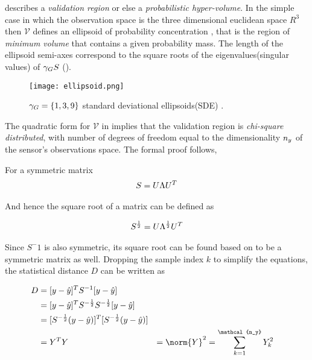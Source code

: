  describes a \emph{validation region} or else a \emph{probabilistic hyper-volume}. In the simple case in which the observation space is the three dimensional euclidean space $R^3$ then $\mathcal{V}$ defines an ellipsoid of probability concentration , that is the region of \emph{minimum volume }that contains a given probability mass. The length of the ellipsoid semi-axes correspond to the square roots of the eigenvalues(singular values) of ${\gamma_G} S$ ().

\begin{figure}[H]
	\centering
	\texttt{[image: ellipsoid.png]}
	\caption{${\gamma_G} = \{1,3,9\}$ standard deviational ellipsoids(SDE) \cite{Wang2015}.}
	\label{fig:ellipsoid}
\end{figure}


The quadratic form for $\mathcal{V}$ in  implies that the validation region is \emph{chi-square distributed}, with number of degrees of freedom equal to the dimensionality $n_{y}$ of the sensor's observations space. The formal proof follows,


For a symmetric matrix 
\begin{equation} \label{eq:matrixsquareroot}
 \begin{matrix}S\end{matrix} = \begin{matrix}U\end{matrix} \begin{matrix}\Lambda\end{matrix} \begin{matrix}U\end{matrix}^T
\end{equation}

And hence the square root of a matrix can be defined as

\begin{equation}\label{eq:matrixsquareroot2}
	\begin{matrix}S\end{matrix}^{\frac{1}{2}} =  \begin{matrix}U\end{matrix} \begin{matrix}\Lambda\end{matrix}^{\frac{1}{2}} \begin{matrix}U\end{matrix}^T
\end{equation}

Since $S^-1$ is also symmetric, its square root can be found based on  to be a symmetric matrix as well. Dropping the sample index $k$ to simplify the equations, the statistical distance $D$ can be written as

\begin{align}
D &= [\realobserv-\predObserv]^T S^{-1} [\realobserv-\predObserv] \\
 &= [\realobserv-\predObserv]^T S^{-\frac{1}{2}} S^{-\frac{1}{2}} [\realobserv-\predObserv] \\
 &= [S^{-\frac{1}{2}}(\realobserv-\predObserv)]^T [S^{-\frac{1}{2}}(\realobserv-\predObserv)] \\
 &= \mat{Y}^T \mat{Y}
 &= \norm{\mat{Y}}^2
 &= \sum_{k=1}^{\mathcal{n_y}} Y_k^2
\end{align}

